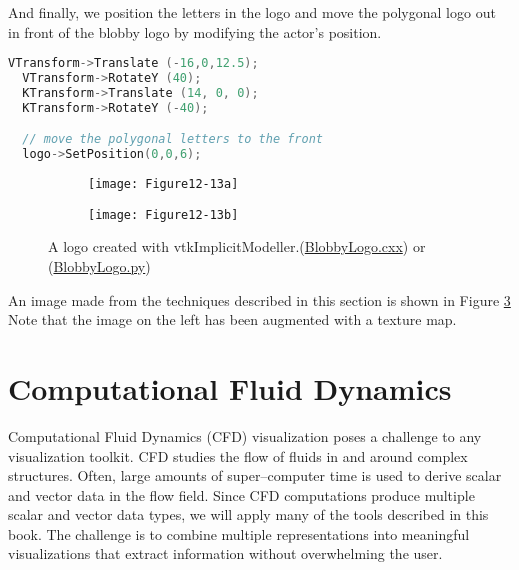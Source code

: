 And finally, we position the letters in the logo and move the
polygonal logo out in front of the blobby logo by modifying the
actor's position.

\begin{lstlisting}[language=C++, caption={Position the letters and move the polygonal logo.}]
  VTransform->Translate (-16,0,12.5);
  VTransform->RotateY (40);
  KTransform->Translate (14, 0, 0);
  KTransform->RotateY (-40);

  // move the polygonal letters to the front
  logo->SetPosition(0,0,6);
\end{lstlisting}

\begin{figure}[htb]
	\begin{subfigure}[h]{0.48\linewidth}
		\texttt{[image: Figure12-13a]}
		\caption*{}
		\label{fig:Figure12-13a}
	\end{subfigure}
	\hfill
	\begin{subfigure}[h]{0.48\linewidth}
		\texttt{[image: Figure12-13b]}
		\caption*{}
		\label{fig:Figure12-13b}
	\end{subfigure}
	\caption{A logo created with vtkImplicitModeller.(\href{https://lorensen.github.io/VTKExamples/site/Cxx/Visualization/BlobbyLogo/}{BlobbyLogo.cxx}) or (\href{https://lorensen.github.io/VTKExamples/site/Python/Visualization/BlobbyLogo/}{BlobbyLogo.py})}\label{fig:Figure12-13}
\end{figure}


An image made from the techniques described in this section is shown
in Figure \ref{fig:Figure12-13}  Note that the image on the left has been augmented with a texture map.

\section{Computational Fluid Dynamics}

Computational Fluid Dynamics (CFD) visualization poses a challenge to any visualization toolkit. CFD studies the flow of fluids in and around complex structures. Often, large amounts of super--computer time is used to derive scalar and vector data in the flow field. Since CFD computations produce multiple scalar and vector data types, we will apply many of the tools described in this book. The challenge is to combine multiple representations into meaningful visualizations that extract information without overwhelming the user.

